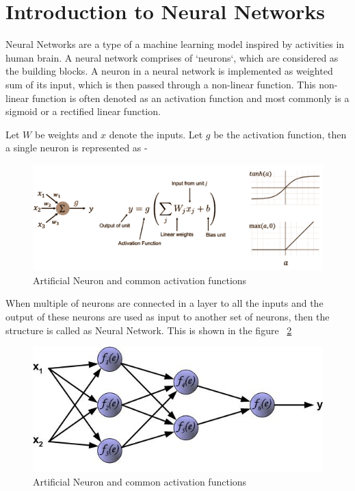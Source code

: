 \section{Introduction to Neural Networks}

Neural Networks are a type of a machine learning model inspired by activities in human brain.
A neural network comprises of `neurons`, which are considered as the building blocks.
A neuron in a neural network is implemented as weighted sum of its input, which is then passed through a non-linear function. This non-linear function is often denoted as an activation function and most commonly is a sigmoid or a rectified linear function.

Let $W$ be weights and $x$ denote the inputs. Let $g$ be the activation function, then a single neuron is represented as - 


\begin{figure}[H]
   \includegraphics[width=1\linewidth, scale=0.9]{figures/intro/neuron.png}
   \caption[Artificial Neuron]{Artificial Neuron and common activation functions}
    \label{fig:neuron}
\end{figure}


When multiple of neurons are connected in a layer to all the inputs and the output of these neurons are used as input to another set of neurons, then the structure is called as Neural Network. This is shown in the figure ~\ref{fig:ann}


\begin{figure}[H]
	\centering
   \includegraphics[scale=0.66]{figures/intro/neural_network_start.bmp}
   \caption[Artificial Neuron]{Artificial Neuron and common activation functions}
   \label{fig:ann}
\end{figure}

